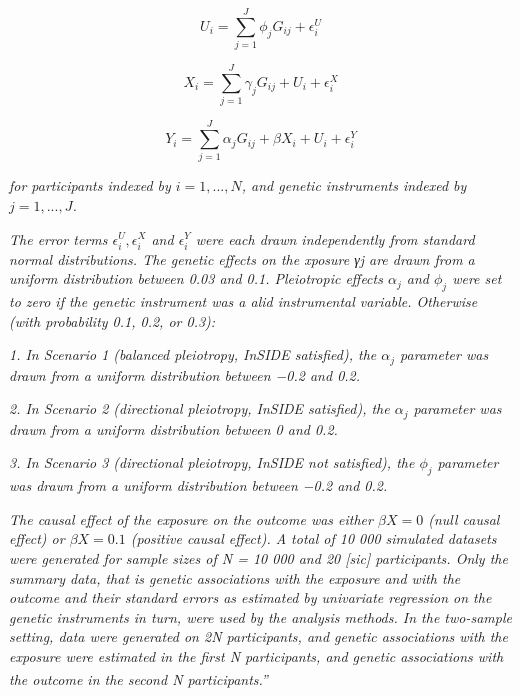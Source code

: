 \documentclass[
]{article}
\begin{document}
\begin{equation}
 U_i = \sum^J_{j=1} \phi_jG_{ij} + \epsilon_i^U
 \end{equation}

\begin{equation}
 X_i = \sum^J_{j=1} \gamma_jG_{ij} + U_i + \epsilon_i^X
 \end{equation}

\begin{equation}
 Y_i = \sum^J_{j=1} \alpha_jG_{ij} + \beta X_i + U_i + \epsilon_i^Y
 \end{equation}

\emph{for participants indexed by \(i = 1, . . . , N\), and genetic instruments indexed by \(j = 1, . . . , J\).}

\emph{The error terms \(\epsilon_i^U , \epsilon_i^X\) and \(\epsilon_i^Y\) were each drawn independently from standard normal distributions. The genetic effects on the xposure γj are drawn from a uniform distribution between 0.03 and 0.1. Pleiotropic effects \(\alpha_j\) and \(\phi_j\) were set to zero if the genetic instrument was a alid instrumental variable. Otherwise (with probability 0.1, 0.2, or 0.3):}

\emph{1. In Scenario 1 (balanced pleiotropy, InSIDE satisfied), the \(\alpha_j\) parameter was drawn from a uniform distribution between −0.2 and 0.2.}

\emph{2. In Scenario 2 (directional pleiotropy, InSIDE satisfied), the \(\alpha_j\) parameter was drawn from a uniform distribution between 0 and 0.2.}

\emph{3. In Scenario 3 (directional pleiotropy, InSIDE not satisfied), the \(\phi_j\) parameter was drawn from a uniform distribution between −0.2 and 0.2.}

\emph{The causal effect of the exposure on the outcome was either \(\beta X = 0\) (null causal effect) or \(\beta X = 0.1\) (positive causal effect). A total of 10 000 simulated datasets were generated for sample sizes of N = 10 000 and 20 {[}sic{]} participants. Only the summary data, that is genetic associations with the exposure and with the outcome and their standard errors as estimated by univariate regression on the genetic instruments in turn, were used by the analysis methods. In the two-sample setting, data were generated on 2N participants, and genetic associations with the exposure were estimated in the first N participants, and genetic associations with the outcome in the second N participants.''}\textsuperscript{}
\end{document}
